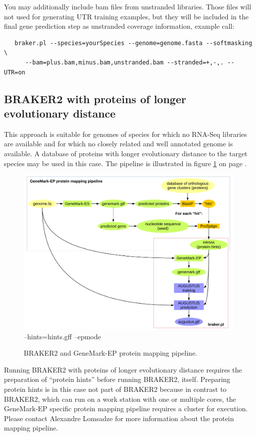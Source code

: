 \documentclass[a4paper,10pt]{report}
\begin{document}
You may additionally include bam files from unstranded libraries. Those files will not used for generating UTR training examples, but they will be included in the final gene prediction step as unstranded coverage information, example call:

\begin{verbatim}
   braker.pl --species=yourSpecies --genome=genome.fasta --softmasking \
      --bam=plus.bam,minus.bam,unstranded.bam --stranded=+,-,. --UTR=on
\end{verbatim}

\subsection{BRAKER2 with proteins of longer evolutionary distance}

This approach is suitable for genomes of species for which no RNA-Seq libraries are available and for which no closely related and well annotated genome is available. A database of proteins with longer evolutionary distance to the target species may be used in this case. The pipeline is illustrated in figure \ref{gatech} on page \pageref{gatech}.

\begin{figure}
 \centering
 \includegraphics[scale=0.4]{./figs/gatech-prot-pipeline.pdf}
 --hints=hints.gff --epmode
 \caption{BRAKER2 and GeneMark-EP protein mapping pipeline.}
 \label{gatech}
\end{figure}

Running BRAKER2 with proteins of longer evolutionary distance requires the preparation of ``protein hints'' before running BRAKER2, itself. Preparing protein hints is in this case not part of BRAKER2 because in contrast to BRAKER2, which can run on a work station with one or multiple cores, the GeneMark-EP specific protein mapping pipeline requires a cluster for execution. Please contact Alexandre Lomsadze for more information about the protein mapping pipeline.
\end{document}
